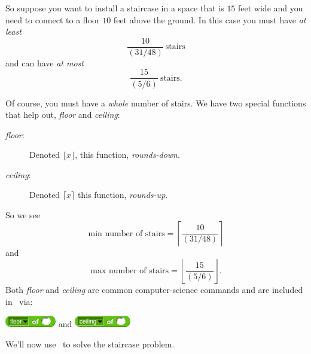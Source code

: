 \documentclass[noauthor,nooutcomes,handout]{../ximera}
\begin{document}
So suppose you want to install a staircase in a space that is $15$
feet wide and you need to connect to a floor $10$ feet above the
ground. In this case you must have \emph{at least}
\[
\frac{10}{\left(31/48\right)} \ \text{stairs}
\]
and can have \emph{at most}
\[
\frac{15}{\left(5/6\right)} \ \text{stairs}.
\]


Of course, you must have a \emph{whole} number of stairs. We have two special functions that help out, \emph{floor} and \emph{ceiling}:
\begin{description}
\item[\emph{floor}:] Denoted $\lfloor x\rfloor$, this function, \emph{rounds-down}.
\item[\emph{ceiling}:] Denoted $\lceil x\rceil$ this function, \emph{rounds-up}.
\end{description}
So we see
\[
\text{min number of stairs} = \left\lceil \frac{10}{\left(31/48\right)} \right\rceil
\]
and
\[
\text{max number of stairs} = \left\lfloor \frac{15}{\left(5/6\right)} \right\rfloor.
\]
Both \emph{floor} and \emph{ceiling} are common computer-science
commands and are included in \snap\ via:
\begin{center}
  \includegraphics{floor-script.png}
  \qquad
  and
  \qquad
\includegraphics{ceiling-script.png}
\end{center}
We'll now use \snap\ to solve the staircase problem.

\mynewpage
\end{document}
